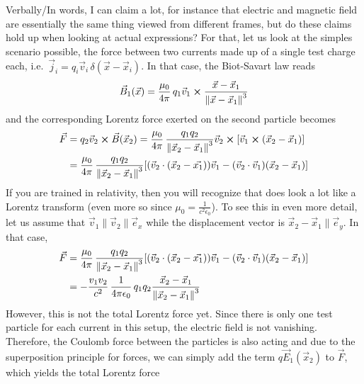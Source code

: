 \documentclass[../class_mech_main.tex]{subfiles}
\DeclareMathOperator{\fpeps}{\frac{1}{4 \pi \epsilon_0}}
\DeclareMathOperator{\fpmu}{\frac{\mu_0}{4 \pi}}
\begin{document}
\begin{ex}\label{ex:point_charge_magn_field}
    Verbally/In words, I can claim a lot, for instance that electric and magnetic field are essentially the same thing viewed from different frames, but do these claims hold up when looking at actual expressions? For that, let us look at the simples scenario possible, the force between two currents made up of a single test charge each, i.e.~$\vec{j}_i = q_i \vec{v}_i \, \delta (\vec{x} - \vec{x}_i)$. In that case, the Biot-Savart law reads
    \begin{equation}
        \vec{B}_1(\vec{x}) = \fpmu q_1 \vec{v}_1 \cross \frac{\vec{x} - \vec{x}_1}{\norm{\vec{x} - \vec{x}_1}^3}
    \end{equation}
    and the corresponding Lorentz force exerted on the second particle becomes
    \begin{align}
        \vec{F} &= q_2 \vec{v}_2 \cross \vec{B}(\vec{x}_2) = \fpmu \frac{q_1 q_2}{\norm{\vec{x}_2 - \vec{x}_1}^3} \vec{v}_2 \cross \qty[\vec{v}_1 \cross (\vec{x}_2 - \vec{x}_1)]
        \notag\\
        &= \fpmu \frac{q_1 q_2}{\norm{\vec{x}_2 - \vec{x}_1}^3} \qty[(\vec{v}_2 \cdot (\vec{x}_2 - \vec{x_1})) \vec{v}_1 - (\vec{v}_2 \cdot \vec{v}_1) (\vec{x}_2 - \vec{x}_1)]
        \notag
    \end{align}
    If you are trained in relativity, then you will recognize that does look a lot like a Lorentz transform (even more so since $\mu_0 = \frac{1}{c^2 \epsilon_0}$). To see this in even more detail, let us assume that $\vec{v}_1 \parallel \vec{v}_2 \parallel \vec{e}_x$ while the displacement vector is $\vec{x}_2 - \vec{x}_1 \parallel \vec{e}_y$. In that case,
    \begin{align}
        \vec{F} &= \fpmu \frac{q_1 q_2}{\norm{\vec{x}_2 - \vec{x}_1}^3} \qty[(\vec{v}_2 \cdot (\vec{x}_2 - \vec{x_1})) \vec{v}_1 - (\vec{v}_2 \cdot \vec{v}_1) (\vec{x}_2 - \vec{x}_1)]
        \notag\\
        &= - \frac{v_1 v_2}{c^2} \fpeps q_1 q_2 \frac{\vec{x}_2 - \vec{x}_1}{\norm{\vec{x}_2 - \vec{x}_1}^3}
        \notag
    \end{align}
    However, this is not the total Lorentz force yet. Since there is only one test particle for each current in this setup, the electric field is not vanishing. Therefore, the Coulomb force between the particles is also acting and due to the superposition principle for forces, we can simply add the term $q \vec{E}_1(\vec{x}_2)$ to $\vec{F}$, which yields the total Lorentz force

\end{ex}
\end{document}

